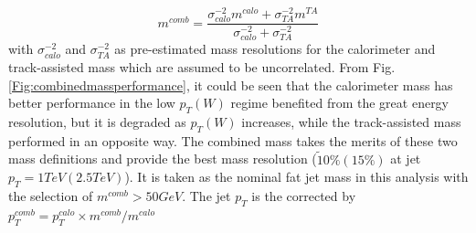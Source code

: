 \begin{equation}
m^{comb} = \frac{\sigma_{{calo}}^{-2} m^{{calo}} + \sigma_{{TA}}^{-2} m^{{TA}} }{\sigma_{{calo}}^{-2} + \sigma_{{TA}}^{-2}}
\end{equation}
with $\sigma_{{calo}}^{-2}$ and $\sigma_{{TA}}^{-2}$ as pre-estimated mass resolutions for  the calorimeter and track-assisted mass which are assumed to be uncorrelated. From Fig. \ref{Fig:combinedmassperformance}, it could be seen that the calorimeter mass has better performance in the low $p_{T}(W)$ regime benefited from the great energy resolution, but it is degraded as $p_{T}(W)$ increases, while the track-assisted mass performed in an opposite way. The combined mass takes the merits of these two mass definitions and provide the best mass resolution ($\tilde 10\% (15\%)$ at jet $p_{T}=1TeV(2.5TeV)$). It is taken as the nominal fat jet mass in this analysis with the selection of $m^{comb}>50GeV$. The jet $p_{T}$ is the corrected by $p_{T}^{comb}=p_{T}^{calo}\times m^{comb}/m^{calo}$ 

